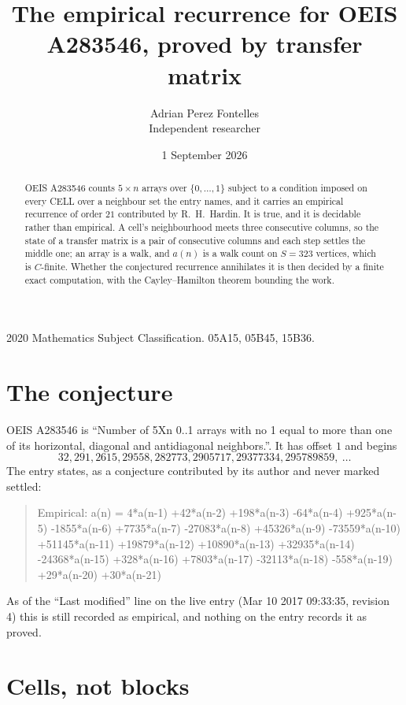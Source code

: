\documentclass[11pt,a4paper]{article}
\title{The empirical recurrence for OEIS A283546, proved by transfer matrix}
\author{Adrian Perez Fontelles\\ \small Independent researcher}
\date{1 September 2026}
\theoremstyle{plain}
\theoremstyle{definition}
\begin{document}
\maketitle

\begin{abstract}
OEIS A283546 counts $5\times n$ arrays over $\{0,\dots,1\}$ subject to a condition imposed on
every CELL over a neighbour set the entry names, and it carries an empirical recurrence of
order $21$ contributed by R.~H.~Hardin. It is true, and it is decidable rather than
empirical. A cell's neighbourhood meets three consecutive columns, so the state of a transfer
matrix is a pair of consecutive columns and each step settles the middle one; an array is a
walk, and $a(n)$ is a walk count on $S=323$ vertices, which is $C$-finite. Whether the
conjectured recurrence annihilates it is then decided by a finite exact computation, with the
Cayley--Hamilton theorem bounding the work.
\end{abstract}

\noindent\small 2020 Mathematics Subject Classification. 05A15, 05B45, 15B36.\normalsize

\section{The conjecture}

OEIS A283546 is ``Number of 5Xn 0..1 arrays with no 1 equal to more than one of its horizontal, diagonal and antidiagonal neighbors.''. It has offset $1$ and begins
\[
32, 291, 2615, 29558, 282773, 2905717, 29377334, 295789859,\ \dots
\]
The entry states, as a conjecture contributed by its author and never marked settled:
\begin{quote}
Empirical: a(n) = 4*a(n-1) +42*a(n-2) +198*a(n-3) -64*a(n-4) +925*a(n-5) -1855*a(n-6) +7735*a(n-7) -27083*a(n-8) +45326*a(n-9) -73559*a(n-10) +51145*a(n-11) +19879*a(n-12) +10890*a(n-13) +32935*a(n-14) -24368*a(n-15) +328*a(n-16) +7803*a(n-17) -32113*a(n-18) -558*a(n-19) +29*a(n-20) +30*a(n-21)
\end{quote}
As of the ``Last modified'' line on the live entry (Mar 10 2017 09:33:35, revision 4) this is still
recorded as empirical, and nothing on the entry records it as proved.

\section{Cells, not blocks}
\end{document}
